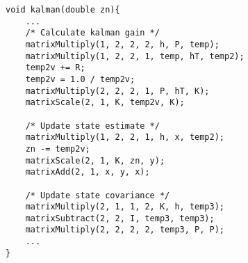\begin{lstlisting}[style=customc, label={kalman_update}, caption={The update step of the kalman filter}]
void kalman(double zn){
    ...
    /* Calculate kalman gain */
    matrixMultiply(1, 2, 2, 2, h, P, temp);
    matrixMultiply(1, 2, 2, 1, temp, hT, temp2);
    temp2v += R;
    temp2v = 1.0 / temp2v;
    matrixMultiply(2, 2, 2, 1, P, hT, K);
    matrixScale(2, 1, K, temp2v, K);

    /* Update state estimate */
    matrixMultiply(1, 2, 2, 1, h, x, temp2);
    zn -= temp2v;
    matrixScale(2, 1, K, zn, y);
    matrixAdd(2, 1, x, y, x);

    /* Update state covariance */
    matrixMultiply(2, 1, 1, 2, K, h, temp3);
    matrixSubtract(2, 2, I, temp3, temp3);
    matrixMultiply(2, 2, 2, 2, temp3, P, P);
    ...
}
\end{lstlisting}

